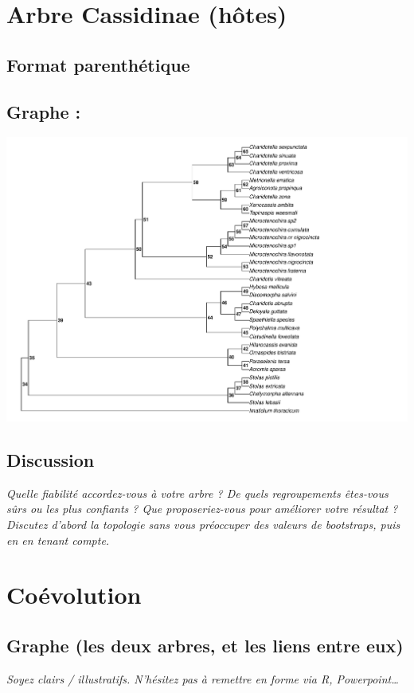 \documentclass[a4paper, 11pt]{article}
\begin{document}
\section{Arbre Cassidinae (hôtes)}
\subsection{Format parenthétique} 


\subsection{Graphe :}
\includegraphics[width = 1\textwidth]{plot_Cassidinae_28S_D2_PhyML_GTR.pdf}
\subsection{Discussion}
\emph{Quelle fiabilité accordez-vous à votre arbre ? De quels regroupements êtes-vous sûrs ou les plus confiants ? Que proposeriez-vous pour améliorer votre résultat ?}
\emph{
Discutez d’abord la topologie sans vous préoccuper des valeurs de bootstraps, puis en en tenant compte.}
\section{Coévolution}

\subsection{Graphe (les deux arbres, et les liens entre eux)}
\emph{Soyez clairs / illustratifs. N’hésitez pas à remettre en forme via R, Powerpoint…}
\end{document}
